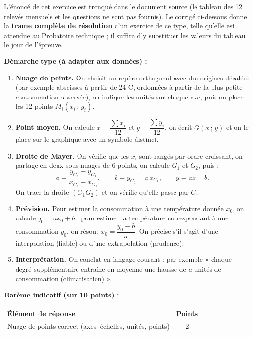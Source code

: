 \documentclass[11pt]{article}
\begin{document}
\begin{corrige}
\begin{attention}
L'énoncé de cet exercice est tronqué dans le document source (le tableau des 12 relevés mensuels et les questions ne sont pas fournis). Le corrigé ci-dessous donne la \textbf{trame complète de résolution} d'un exercice de ce type, telle qu'elle est attendue au Probatoire technique ; il suffira d'y substituer les valeurs du tableau le jour de l'épreuve.
\end{attention}
\textbf{Démarche type (à adapter aux données) :}
\begin{enumerate}
\item \textbf{Nuage de points.} On choisit un repère orthogonal avec des origines décalées (par exemple abscisses à partir de 24 \textdegree C, ordonnées à partir de la plus petite consommation observée), on indique les unités sur chaque axe, puis on place les 12 points $M_i(x_i\,;\,y_i)$.
\item \textbf{Point moyen.} On calcule $\bar{x}=\dfrac{\sum x_i}{12}$ et $\bar{y}=\dfrac{\sum y_i}{12}$, on écrit $G(\bar{x}\,;\,\bar{y})$ et on le place sur le graphique avec un symbole distinct.
\item \textbf{Droite de Mayer.} On vérifie que les $x_i$ sont rangés par ordre croissant, on partage en deux sous-nuages de 6 points, on calcule $G_1$ et $G_2$, puis :
\[ a=\frac{y_{G_2}-y_{G_1}}{x_{G_2}-x_{G_1}}, \qquad b=y_{G_1}-a\,x_{G_1}, \qquad y=ax+b. \]
On trace la droite $(G_1G_2)$ et on vérifie qu'elle passe par $G$.
\item \textbf{Prévision.} Pour estimer la consommation à une température donnée $x_0$, on calcule $y_0=ax_0+b$ ; pour estimer la température correspondant à une consommation $y_0$, on résout $x_0=\dfrac{y_0-b}{a}$. On précise s'il s'agit d'une interpolation (fiable) ou d'une extrapolation (prudence).
\item \textbf{Interprétation.} On conclut en langage courant : par exemple « chaque degré supplémentaire entraîne en moyenne une hausse de $a$ unités de consommation (climatisation) ».
\end{enumerate}
\textbf{Barème indicatif (sur 10 points) :}
\begin{center}
\begin{tabularx}{\linewidth}{|X|c|}
\hline
\rowcolor{popblueL} \textbf{Élément de réponse} & \textbf{Points} \\
\hline
Nuage de points correct (axes, échelles, unités, points) & 2 \\

\end{tabularx}
\end{center}
\end{corrige}
\end{document}
